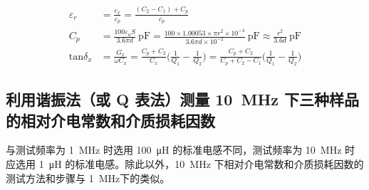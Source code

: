\documentclass[a4paper,utf8]{article}
\begin{document}
    \begin{align}
        \varepsilon_r&=\frac{c_x}{c_p}=\frac{(C_2-C_1)+C_p}{c_p}\label{eq18}\\
        C_p&=\frac{100\varepsilon_aS}{3.6\pi d}\:\unit{\pico\farad}=\frac{100\times1.00053\times\pi r^2\times10^{-4}}{3.6\pi d\times10^{-2}}\:\unit{\pico\farad}\approx\frac{r^2}{3.6d}\:\unit{\pico\farad}\label{eq19}\\
        \mathrm{tan}\delta_{x}&=\frac{G_{x}}{\omega C_{x}}=\frac{C_{p}+C_{2}}{C_{x}}\biggl(\frac{1}{Q_{1}}-\frac{1}{Q_{2}}\biggr)=\frac{C_{p}+C_{2}}{C_{p}+C_{2}-C_{1}}\biggl(\frac{1}{Q_{1}}-\frac{1}{Q_{2}}\biggr)\label{eq22}
    \end{align}
    \subsection{利用谐振法（或 Q 表法）测量 \SI{10}{\mega\hertz} 下三种样品的相对介电常数和介质损耗因数}
        与测试频率为 \SI{1}{\mega\hertz} 时选用 \SI{100}{\micro\henry} 的标准电感不同，测试频率为 \SI{10}{\mega\hertz} 时应选用 \SI{1}{\micro\henry} 的标准电感。除此以外，\SI{10}{\mega\hertz} 下相对介电常数和介质损耗因数的测试方法和步骤与 \SI{1}{\mega\hertz}下的类似。
\end{document}
